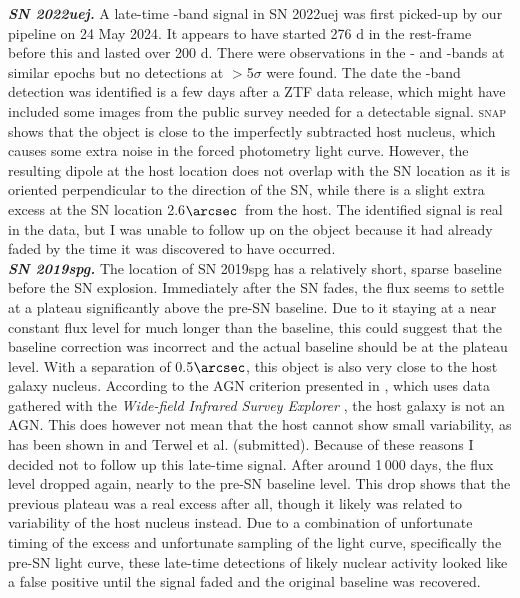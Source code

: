 \documentclass[a4paper,oneside,12pt, class=Latex/Classes/PhDthesisPSnPDF, crop=false]{standalone}
\begin{document}
\textit{\textbf{SN 2022uej.}}
A late-time \ztfr-band signal in SN 2022uej was first picked-up by our pipeline on 24 May 2024. It appears to have started 276 d in the rest-frame before this and lasted over 200 d. There were observations in the \ztfg- and \ztfi-bands at similar epochs but no detections at $>$5$\sigma$ were found. The date the \ztfr-band detection was identified is a few days after a ZTF data release, which might have included some images from the public survey needed for a detectable signal. \textsc{snap} shows that the object is close to the imperfectly subtracted host nucleus, which causes some extra noise in the forced photometry light curve. However, the resulting dipole at the host location does not overlap with the SN location as it is oriented perpendicular to the direction of the SN, while there is a slight extra excess at the SN location 2.6$\arcsec$\ from the host. The identified signal is real in the data, but I was unable to follow up on the object because it had already faded by the time it was discovered to have occurred.\\


\textit{\textbf{SN 2019spg.}}
The location of SN 2019spg has a relatively short, sparse baseline before the SN explosion. Immediately after the SN fades, the flux seems to settle at a plateau significantly above the pre-SN baseline. Due to it staying at a near constant flux level for much longer than the baseline, this could suggest that the baseline correction was incorrect and the actual baseline should be at the plateau level. With a separation of 0.5$\arcsec$, this object is also very close to the host galaxy nucleus. According to the AGN criterion presented in \citet{WISE_crit}, which uses data gathered with the \textit{Wide-field Infrared Survey Explorer} \citep[WISE,][]{WISE}, the host galaxy is not an AGN. This does however not mean that the host cannot show small variability, as has been shown in \citet{Terwel_2024_paper1} and Terwel et al. (submitted). Because of these reasons I decided not to follow up this late-time signal. After around 1\,000 days, the flux level dropped again, nearly to the pre-SN baseline level. This drop shows that the previous plateau was a real excess after all, though it likely was related to variability of the host nucleus instead. Due to a combination of unfortunate timing of the excess and unfortunate sampling of the light curve, specifically the pre-SN light curve, these late-time detections of likely nuclear activity looked like a false positive until the signal faded and the original baseline was recovered.
\end{document}
